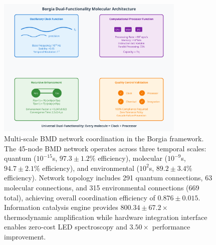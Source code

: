     \begin{figure}[H]
        \centering
        \includegraphics[width=0.8\textwidth]{images/molecular-information-storage-mechanisms.pdf}
        \caption{Multi-scale BMD network coordination in the Borgia framework. The 45-node BMD network operates across three temporal scales: quantum ($10^{-15}$s, $97.3 \pm 1.2\%$ efficiency), molecular ($10^{-9}$s, $94.7 \pm 2.1\%$ efficiency), and environmental ($10^{2}$s, $89.2 \pm 3.4\%$ efficiency). Network topology includes 291 quantum connections, 63 molecular connections, and 315 environmental connections (669 total), achieving overall coordination efficiency of $0.876 \pm 0.015$. Information catalysis engine provides $800.34 \pm 67.2 \times$ thermodynamic amplification while hardware integration interface enables zero-cost LED spectroscopy and $3.50 \times$ performance improvement.}
        \label{fig:universal_computing}
        \end{figure}